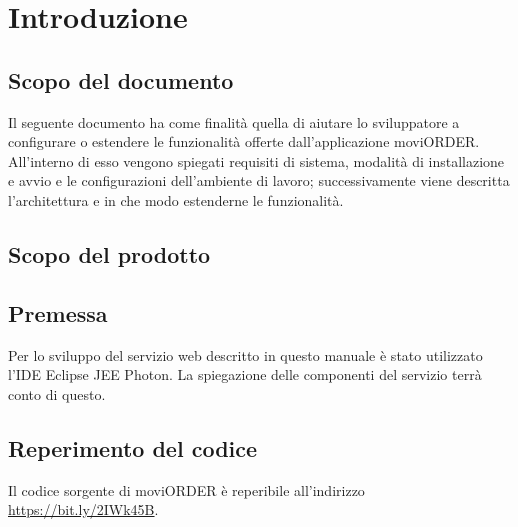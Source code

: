 \section{Introduzione} \label{introduzione}

    \subsection{Scopo del documento}

        Il seguente documento ha come finalità quella di aiutare lo sviluppatore a configurare o estendere le funzionalità
        offerte dall'applicazione moviORDER.
        All'interno di esso vengono spiegati requisiti di sistema, modalità di installazione e avvio e le configurazioni
        dell'ambiente di lavoro; successivamente viene descritta l'architettura e in che modo estenderne le funzionalità.

    \subsection{Scopo del prodotto}

        \ScopoProdotto{}

    \subsection{Premessa} \label{premessa}

        Per lo sviluppo del servizio web descritto in questo manuale è stato utilizzato l'IDE Eclipse JEE Photon. La spiegazione delle componenti del servizio terrà conto di questo.

    \subsection{Reperimento del codice} \label{reperimentocodice}

    	Il codice sorgente di moviORDER è reperibile all'indirizzo \url{https://bit.ly/2IWk45B}.
